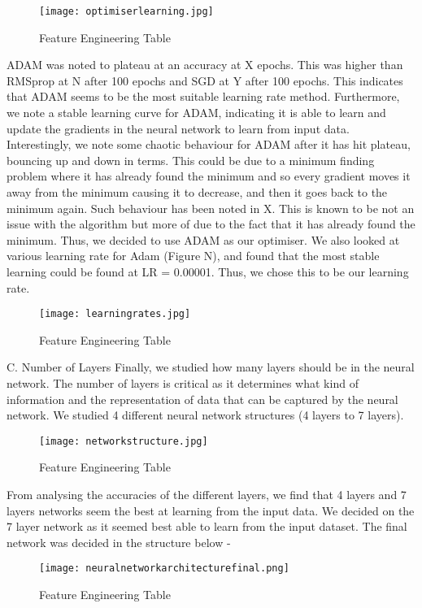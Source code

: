 \documentclass{article}
\begin{document}
\begin{figure}[H]
\caption{Feature Engineering Table}
\texttt{[image: optimiserlearning.jpg]}
\centering
\end{figure}

ADAM was noted to plateau at an accuracy at X epochs. This was higher than RMSprop at N after 100 epochs and SGD at Y after 100 epochs. This indicates that ADAM seems to be the most suitable learning rate method. Furthermore, we note a stable learning curve for ADAM, indicating it is able to learn and update the gradients in the neural network to learn from input data. Interestingly, we note some chaotic behaviour for ADAM after it has hit plateau, bouncing up and down in terms. This could be due to a minimum finding problem where it has already found the minimum and so every gradient moves it away from the minimum causing it to decrease, and then it goes back to the minimum again. Such behaviour has been noted in X. This is known to be not an issue with the algorithm but more of due to the fact that it has already found the minimum. Thus, we decided to use ADAM as our optimiser. We also looked at various learning rate for Adam (Figure N), and found that the most stable learning could be found at LR = 0.00001. Thus, we chose this to be our learning rate.


\begin{figure}[H]
\caption{Feature Engineering Table}
\texttt{[image: learningrates.jpg]}
\centering
\end{figure}


C. Number of Layers 
Finally, we studied how many layers should be in the neural network. The number of layers is critical as it determines what kind of information and the representation of data that can be captured by the neural network. We studied 4 different neural network structures (4 layers to 7 layers). 

\begin{figure}[H]
\caption{Feature Engineering Table}
\texttt{[image: networkstructure.jpg]}
\centering
\end{figure}

From analysing the accuracies of the different layers, we find that 4 layers and 7 layers networks seem the best at learning from the input data. We decided on the 7 layer network as it seemed best able to learn from the input dataset. The final network was decided in the structure below - 

\begin{figure}[H]
\caption{Feature Engineering Table}
\texttt{[image: neuralnetworkarchitecturefinal.png]}
\centering
\end{figure}
\end{document}
